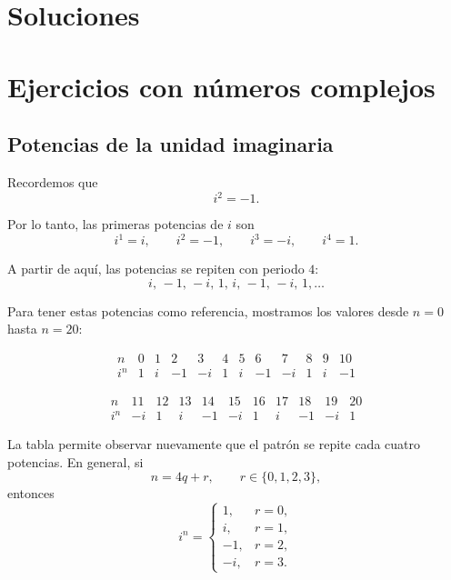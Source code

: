 \section{Soluciones}

\section{Ejercicios con números complejos}

\subsection{Potencias de la unidad imaginaria}

Recordemos que
\[
i^2=-1.
\]

Por lo tanto, las primeras potencias de $i$ son
\[
i^1=i,\qquad
i^2=-1,\qquad
i^3=-i,\qquad
i^4=1.
\]

A partir de aquí, las potencias se repiten con periodo $4$:
\[
i,\,-1,\,-i,\,1,\,
i,\,-1,\,-i,\,1,\ldots
\]


\medskip

Para tener estas potencias como referencia, mostramos los valores desde
$n=0$ hasta $n=20$:

\[
\begin{array}{c|ccccccccccc}
n     &0&1&2&3&4&5&6&7&8&9&10\\ \hline
i^n   &1&i&-1&-i&1&i&-1&-i&1&i&-1
\end{array}
\]

\[
\begin{array}{c|cccccccccc}
n     &11&12&13&14&15&16&17&18&19&20\\ \hline
i^n   &-i&1&i&-1&-i&1&i&-1&-i&1
\end{array}
\]

La tabla permite observar nuevamente que el patrón se repite cada cuatro
potencias. En general, si
\[
n=4q+r,\qquad r\in\{0,1,2,3\},
\]
entonces
\[
\boxed{
i^n=
\begin{cases}
1, & r=0,\\
i, & r=1,\\
-1, & r=2,\\
-i, & r=3.
\end{cases}
}
\]

